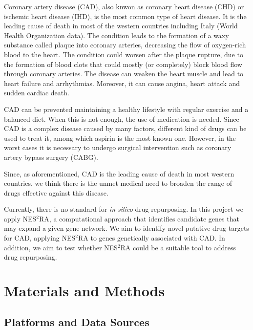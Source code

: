 \documentclass[fleqn,10pt]{SelfArx} %
\begin{document}
Coronary artery disease (CAD), also knwon as coronary heart disease (CHD) or ischemic heart disease (IHD), is the most common type of heart disease. It is the leading cause of death in most of the western countries including Italy (World Health Organization data). The condition leads to the formation of a waxy substance called plaque into coronary arteries, decreasing the flow of oxygen-rich blood to the heart. The condition could worsen after the plaque rupture, due to the formation of blood clots that could mostly (or completely) block blood flow through coronary arteries. The disease can weaken the heart muscle and lead to heart failure and arrhythmias. Moreover, it can cause angina, heart attack and sudden cardiac death. \cite{Wong}

CAD can be prevented maintaining a healthy lifestyle with regular exercise and a balanced diet. When this is not enough, the use of medication is needed. Since CAD is a complex disease caused by many factors, different kind of drugs can be used to treat it, among which aspirin is the most known one. However, in the worst cases it is necessary to undergo surgical intervention such as coronary artery bypass surgery (CABG).

Since, as aforementioned, CAD is the leading cause of death in most western countries, we think there is the unmet medical need to broaden the range of drugs effective against this disease.

Currently, there is no standard for \textit{in silico} drug repurposing. In this project we apply NES$^2$RA\cite{NES2RA}, a computational approach that identifies candidate genes that may expand a given gene network. We aim to identify novel putative drug targets for CAD, applying NES$^2$RA to genes genetically associated with CAD. In addition, we aim to test whether NES$^2$RA could be a suitable tool to address drug repurposing.

\section*{Materials and Methods}

\subsection*{Platforms and Data Sources}
\end{document}

